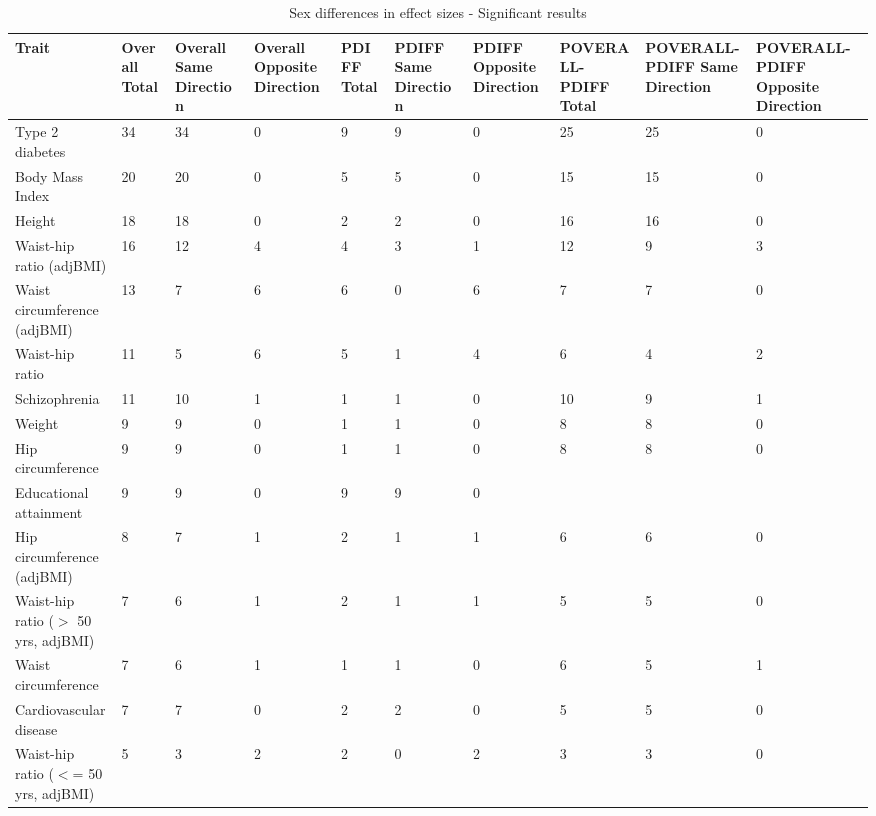 \documentclass{article}\usepackage[]{graphicx}\usepackage[dvipsnames]{xcolor}
\begin{document}
\renewcommand{\arraystretch}{1.3}

% 
\setcounter{table}{3}
\renewcommand{\tablename}{Supplementary Table} %


\begin{longtable}{p{6cm}|p{1.5cm}|p{1.5cm}|p{1.5cm}p{1.5cm}|p{1.5cm}|p{1.5cm}|p{1.5cm}|p{1.5cm}|p{1.5cm}}

\caption{Sex differences in effect sizes - Significant results}\\

  \hline
Trait & Overall Total & Overall Same Direction & Overall Opposite Direction & PDIFF Total & PDIFF Same Direction & PDIFF Opposite Direction & POVERALL-PDIFF Total & POVERALL-PDIFF Same Direction & POVERALL-PDIFF Opposite Direction \\ 
  \hline
Type 2 diabetes &  34 &  34 &   0 &   9 &   9 &   0 &  25 &  25 &   0 \\ 
  Body Mass Index &  20 &  20 &   0 &   5 &   5 &   0 &  15 &  15 &   0 \\ 
  Height &  18 &  18 &   0 &   2 &   2 &   0 &  16 &  16 &   0 \\ 
  Waist-hip ratio (adjBMI) &  16 &  12 &   4 &   4 &   3 &   1 &  12 &   9 &   3 \\ 
  Waist circumference (adjBMI) &  13 &   7 &   6 &   6 &   0 &   6 &   7 &   7 &   0 \\ 
  Waist-hip ratio &  11 &   5 &   6 &   5 &   1 &   4 &   6 &   4 &   2 \\ 
  Schizophrenia &  11 &  10 &   1 &   1 &   1 &   0 &  10 &   9 &   1 \\ 
  Weight &   9 &   9 &   0 &   1 &   1 &   0 &   8 &   8 &   0 \\ 
  Hip circumference &   9 &   9 &   0 &   1 &   1 &   0 &   8 &   8 &   0 \\ 
  Educational attainment &   9 &   9 &   0 &   9 &   9 &   0 &  &  &  \\ 
  Hip circumference (adjBMI) &   8 &   7 &   1 &   2 &   1 &   1 &   6 &   6 &   0 \\ 
  Waist-hip ratio ($>$ 50 yrs, adjBMI) &   7 &   6 &   1 &   2 &   1 &   1 &   5 &   5 &   0 \\ 
  Waist circumference &   7 &   6 &   1 &   1 &   1 &   0 &   6 &   5 &   1 \\ 
  Cardiovascular disease &   7 &   7 &   0 &   2 &   2 &   0 &   5 &   5 &   0 \\ 
  Waist-hip ratio ($<$= 50 yrs, adjBMI) &   5 &   3 &   2 &   2 &   0 &   2 &   3 &   3 &   0 \\ 

\end{longtable}
\end{document}
